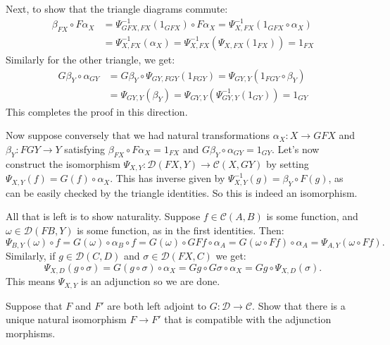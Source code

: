 \documentclass[11pt,letterpaper]{article}
\def\CC{\mathcal{C}}
\def\DD{\mathcal{D}}
\begin{document}
\begin{solution}
    Next, to show that the triangle diagrams commute:
    \[
        \begin{aligned}
            \beta_{FX}\circ F\alpha_X &= \Psi_{GFX,FX}^{-1}(1_{GFX})\circ F\alpha_X = \Psi_{X,FX}^{-1}(1_{GFX}\circ \alpha_X)\\
            &=\Psi_{X,FX}^{-1}(\alpha_X)=\Psi_{X,FX}^{-1}(\Psi_{X,FX}(1_{FX})) = 1_{FX}
        \end{aligned}
    \] 
    Similarly for the other triangle, we get:
    \[
        \begin{aligned}
            G\beta_Y \circ \alpha_{GY} &= G\beta_Y \circ \Psi_{GY,FGY}(1_{FGY}) = \Psi_{GY,Y}(1_{FGY}\circ \beta_Y)\\
            &=\Psi_{GY,Y}(\beta_Y) = \Psi_{GY,Y}(\Psi^{-1}_{GY,Y}(1_{GY})) = 1_{GY}
        \end{aligned}
    \] 
    This completes the proof in this direction. 
    
    \quad Now suppose conversely that we had natural transformations $\alpha_X : X \to GFX$ and $\beta_Y : FGY \to Y$ satisfying $\beta_{FX}\circ F{\alpha_X} = 1_{FX}$ and $G\beta_Y\circ \alpha_{GY}=1_{GY}$. Let's now construct the isomorphism $\Psi_{X,Y} : \DD(FX, Y) \to \CC(X,GY)$ by setting $\Psi_{X,Y}(f) = G(f)\circ\alpha_X$. This has inverse given by $\Psi^{-1}_{X,Y}(g)=\beta_Y\circ F(g)$, as can be easily checked by the triangle identities. So this is indeed an isomorphism.

    \quad All that is left is to show naturality. Suppose $f \in \CC(A,B)$ is some function, and $\omega\in \DD(FB, Y)$ is some function, as in the first identities. Then:
    \[
        \Psi_{B,Y}(\omega)\circ f = G(\omega)\circ \alpha_B\circ f =G(\omega)\circ GFf\circ \alpha_A = G(\omega\circ Ff)\circ \alpha_A = \Psi_{A,Y}(\omega\circ Ff)
    .\] 
    Similarly, if $g\in \DD(C,D)$ and $\sigma\in \DD(FX,C)$ we get:
    \[
        \Psi_{X,D}(g\circ \sigma) = G(g\circ \sigma)\circ \alpha_X = Gg\circ G\sigma\circ \alpha_X = Gg\circ \Psi_{X,D}(\sigma)
    .\] 
    This means $\Psi_{X,Y}$ is an adjunction so we are done.
\end{solution}

\begin{problem}
    Suppose that $F$ and $F'$ are both left adjoint to $G : \DD \to \CC$. Show that there is a unique natural isomorphism $F \to F'$ that is compatible with the adjunction morphisms.
\end{problem}
\end{document}
